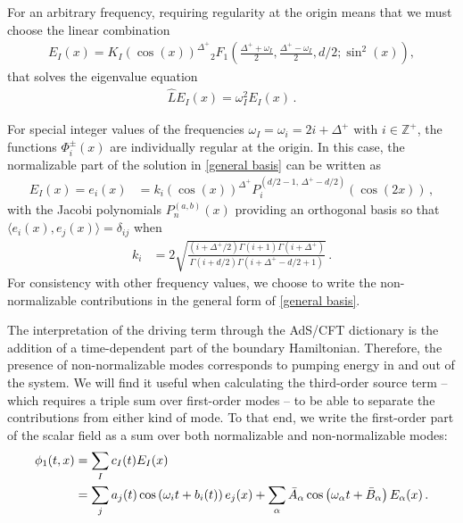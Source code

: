 \documentclass[../PhD.tex]{subfiles}
\begin{document}
For an arbitrary frequency, requiring regularity at the origin means that we must choose the linear combination \cite{Nastase}
\begin{align}
\label{general basis}
E_I (x) =  K_I \left( \cos(x) \right)^{\Delta^+} {_2F_1} \left(\frac{\Delta^+ + \omega_I}{2}, \frac{\Delta^+ - \omega_I}{2}, d/2 ; \sin^2 (x) \right) ,
\end{align}
that solves the eigenvalue equation
\begin{align}
\label{eigen eqn}
\hat L E_I (x) = \omega_I^2 E_I (x) \, .
\end{align}

For special integer values of the frequencies $\omega_I = \omega_i = 2i + \Delta^+$ with $i \in \mathbb{Z}^+$, the functions $\Phi^\pm_i (x)$ are individually regular at the origin. In this case, the normalizable part of the solution in \eqref{general basis} can be written as
\begin{align}
\label{normal basis}
E_I (x) = e_i(x) &= k_i \left( \cos(x) \right)^{\Delta^+} P_{i}^{(d/2 - 1, \, \Delta^+ - d/2)} \left( \cos (2x) \right) \, ,
\end{align}
with the Jacobi polynomials $P^{(a,b)}_n (x)$ providing an orthogonal basis so that ${\langle e_i (x), e_j(x) \rangle = \delta_{i j}}$ when
\begin{align}
k_i &= 2 \sqrt{\frac{(i + \Delta^+ /2) \Gamma(i+1) \Gamma(i+\Delta^+)}{\Gamma(i+d/2) \Gamma(i + \Delta^+ - d/2 + 1)}} \, .
\end{align}
For consistency with other frequency values, we choose to write the non-normalizable contributions in the general form of \eqref{general basis}. 

The interpretation of the driving term through the AdS/CFT dictionary is the addition of a time-dependent part of the boundary Hamiltonian. Therefore, the presence of non-normalizable modes corresponds to pumping energy in and out of the system. We will find it useful when calculating the third-order source term -- which requires a triple sum over first-order modes -- to be able to separate the contributions from either kind of mode. To that end, we write the first-order part of the scalar field as a sum over both normalizable and non-normalizable modes:
\begin{align}
\label{phi1 gen}
\phi_1(t,x) &= \sum_I c_I (t)  E_I (x) \nonumber \\
&= \sum_j a_j (t) \cos \left( \omega_i t + b_i(t) \right) e_j(x) + \sum_\alpha \bar A_\alpha \cos \left( \omega_\alpha t + \bar{B}_\alpha \right) E_\alpha(x) \, .
\end{align}
\end{document}
